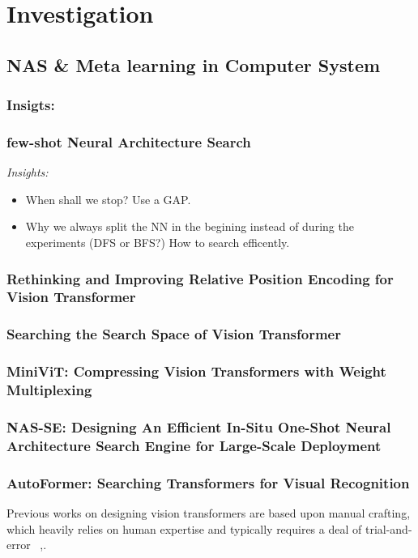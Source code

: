 \documentclass[8pt,UTF8]{article}
\begin{document}
\section{Investigation}
    \subsection{NAS \& Meta learning in Computer System}
        \subsubsection{Insigts:}
        \subsubsection{few-shot Neural Architecture Search}
            \emph{Insights:}
            \begin{itemize}
                \item When shall we stop? Use a GAP.
                \item Why we always split the NN in the begining instead of during the experiments (DFS or BFS?) How to search efficently.
            \end{itemize}
        \subsubsection{Rethinking and Improving Relative Position Encoding for Vision Transformer}
        \subsubsection{Searching the Search Space of Vision Transformer}
        \subsubsection{MiniViT: Compressing Vision Transformers with Weight Multiplexing}
        \subsubsection{NAS-SE: Designing An Efficient In-Situ One-Shot Neural Architecture Search Engine for Large-Scale Deployment}
        \subsubsection{AutoFormer: Searching Transformers for Visual Recognition}
            Previous works on designing vision transformers are based upon manual crafting, which heavily relies on human expertise and typically requires a deal of trial-and- error ~\cite{yuan2021tokens, touvron2021training, dosovitskiy2020image},.
            
\end{document}
